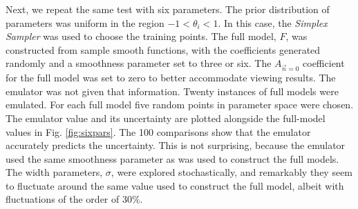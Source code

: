 \documentclass[UserManual.tex]{subfiles}
\begin{document}
Next, we repeat the same test with six parameters. The prior distribution of parameters was uniform in the region $-1<\theta_i<1$. In this case, the {\it Simplex Sampler} was used to choose the training points. The full model, $F$, was constructed from sample smooth functions, with the coefficients generated randomly and a smoothness parameter set to three or six. The $A_{\vec{n}=0}$ coefficient for the full model was set to zero to better accommodate viewing results. The emulator was not given that information. Twenty instances of full models were emulated. For each full model five random points in parameter space were chosen. The emulator value and its uncertainty are plotted alongside the full-model values in Fig. \ref{fig:sixpars}. The 100 comparisons show that the emulator accurately predicts the uncertainty. This is not surprising, because the emulator used the same smoothness parameter as was used to construct the full models. The width parameters, $\sigma$, were explored stochastically, and remarkably they seem to fluctuate around the same value used to construct the full model, albeit with fluctuations of the order of 30\%. 
\end{document}
